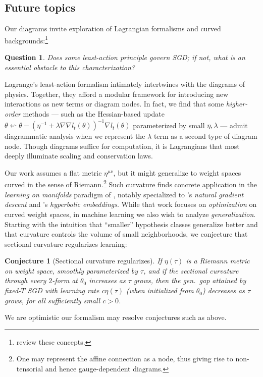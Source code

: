 \documentclass[anon,12pt]{colt2021} %
\newtheorem{conj}{Conjecture}
\newtheorem{quest}{Question}
\begin{document}
{            %
    \subsection{Future topics}                                      \label{appendix:future}

        Our diagrams invite exploration of Lagrangian formalisms and curved
        backgrounds:\footnote{
            \cite{la60, la51} review these concepts.
        }
        \begin{quest}
            Does some least-action principle govern SGD; if not, what is an
            essential obstacle to this characterization?
        \end{quest}
        Lagrange's least-action formalism intimately intertwines with the
        diagrams of physics.  Together, they afford a modular framework for
        introducing new interactions as new terms or diagram nodes.  In fact,
        we find that some \emph{higher-order} methods --- such as the
        Hessian-based update
        $
            \theta \leftsquigarrow
            \theta -
            (\eta^{-1} + \lambda \nabla \nabla l_t(\theta))^{-1}
            \nabla l_t(\theta)
        $
        parameterized by small $\eta, \lambda$ --- admit diagrammatic analysis
        when we represent the $\lambda$ term as a second type of diagram node.
        Though diagrams suffice for computation, it is Lagrangians that most
        deeply illuminate scaling and conservation laws.

        Our work assumes a flat metric $\eta^{\mu\nu}$, but it might
        generalize to weight spaces curved in the sense of Riemann.\footnote{
            One may represent the affine connection as a node, thus giving
            rise to non-tensorial and hence gauge-dependent diagrams.
        }  Such curvature finds concrete application in the \emph{learning on
        manifolds} paradigm of \cite{ab07, zh16}, notably specialized to
        \cite{am98}'s \emph{natural gradient descent} and \cite{ni17}'s
        \emph{hyperbolic embeddings}.  While that work focuses on
        \emph{optimization} on curved weight spaces, in machine learning we
        also wish to analyze \emph{generalization}.
        Starting with the intuition that ``smaller'' hypothesis classes
        generalize better and that curvature controls the volume of small
        neighborhoods, we conjecture that sectional curvature regularizes
        learning:
        \begin{conj}[Sectional curvature regularizes]
            If $\eta(\tau)$ is a Riemann metric on weight space, smoothly
            parameterized by $\tau$, and if the sectional curvature through
            every $2$-form at $\theta_0$ increases as $\tau$ grows, then
            the gen.\ gap attained by fixed-$T$ SGD with learning rate $c
            \eta(\tau)$ (when initialized from $\theta_0$) decreases as $\tau$
            grows, for all sufficiently small $c>0$.
        \end{conj}
        We are optimistic our formalism may resolve conjectures such as above.

}
\end{document}
